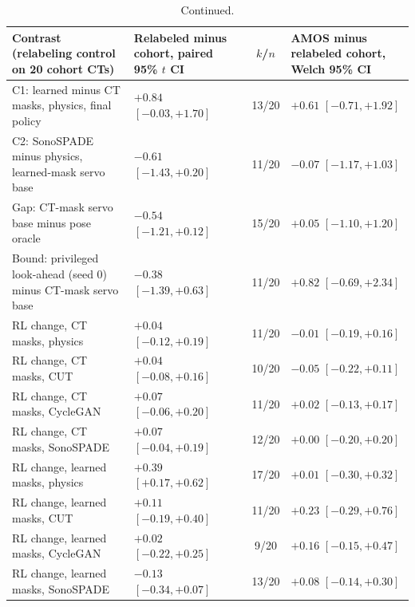 \begin{table}[tp]
\renewcommand{\baselinestretch}{1}\scriptsize
\ContinuedFloat
\caption[]{Continued.}
\centering
\setlength{\tabcolsep}{2.5pt}
\begin{tabularx}{\textwidth}{@{}>{\raggedright\arraybackslash}X l c l@{}}
\toprule
Contrast (relabeling control on 20 cohort CTs) & Relabeled minus cohort, paired 95\% $t$ CI & $k$/$n$ & AMOS minus relabeled cohort, Welch 95\% CI \\
\midrule
\quad C1: learned minus CT masks, physics, final policy & $+0.84$ $[-0.03, +1.70]$ & 13/20 & $+0.61$ $[-0.71, +1.92]$ \\
\quad C2: SonoSPADE minus physics, learned-mask servo base & $-0.61$ $[-1.43, +0.20]$ & 11/20 & $-0.07$ $[-1.17, +1.03]$ \\
\quad Gap: CT-mask servo base minus pose oracle & $-0.54$ $[-1.21, +0.12]$ & 15/20 & $+0.05$ $[-1.10, +1.20]$ \\
\quad Bound: privileged look-ahead (seed 0) minus CT-mask servo base & $-0.38$ $[-1.39, +0.63]$ & 11/20 & $+0.82$ $[-0.69, +2.34]$ \\
\quad RL change, CT masks, physics & $+0.04$ $[-0.12, +0.19]$ & 11/20 & $-0.01$ $[-0.19, +0.16]$ \\
\quad RL change, CT masks, CUT & $+0.04$ $[-0.08, +0.16]$ & 10/20 & $-0.05$ $[-0.22, +0.11]$ \\
\quad RL change, CT masks, CycleGAN & $+0.07$ $[-0.06, +0.20]$ & 11/20 & $+0.02$ $[-0.13, +0.17]$ \\
\quad RL change, CT masks, SonoSPADE & $+0.07$ $[-0.04, +0.19]$ & 12/20 & $+0.00$ $[-0.20, +0.20]$ \\
\quad RL change, learned masks, physics & $+0.39$ $[+0.17, +0.62]$ & 17/20 & $+0.01$ $[-0.30, +0.32]$ \\
\quad RL change, learned masks, CUT & $+0.11$ $[-0.19, +0.40]$ & 11/20 & $+0.23$ $[-0.29, +0.76]$ \\
\quad RL change, learned masks, CycleGAN & $+0.02$ $[-0.22, +0.25]$ & 9/20 & $+0.16$ $[-0.15, +0.47]$ \\
\quad RL change, learned masks, SonoSPADE & $-0.13$ $[-0.34, +0.07]$ & 13/20 & $+0.08$ $[-0.14, +0.30]$ \\
\bottomrule
\end{tabularx}
\end{table}
